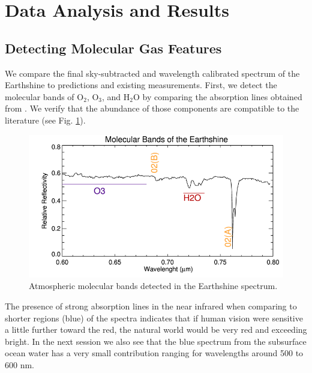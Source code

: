 \section{Data Analysis and Results}

\subsection{Detecting Molecular Gas Features}

We compare the final sky-subtracted and wavelength calibrated spectrum of the
Earthshine to predictions and existing measurements. First, we
detect the molecular bands of O$_2$, O$_3$, and H$_2$O by comparing the
 absorption lines obtained from \cite{nuclear}.  We verify that the abundance of
those components are compatible to the
literature (see  Fig. \ref{mol}). 

\begin{figure}[htb]
\begin{center}
\includegraphics[scale=0.5]{plots/mo1.png}
  \caption{Atmospheric molecular bands detected in the Earthshine spectrum.}
\label{mol}
\end{center}
\end{figure}


The presence of strong
absorption lines in the near infrared when comparing to  shorter regions (blue)
of the spectra indicates that if human vision were sensitive a little further
toward the red, the natural world would be very red and exceeding bright. In the
next session we also see that the blue spectrum from the subsurface ocean water
has a very small contribution ranging for wavelengths around 500 to 600 nm.





